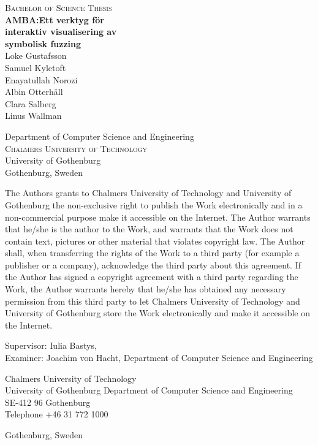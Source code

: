 \newpage
\thispagestyle{empty}
\begin{center}

	\textsc{\large Bachelor of Science Thesis }\\[4cm]

	\textbf{\Large AMBA:\@ Ett verktyg för \\ interaktiv visualisering av \\ symbolisk fuzzing} \\[1cm]
	{\large Loke Gustafsson} \\
	{\large Samuel Kyletoft} \\
	{\large Enayatullah Norozi} \\
	{\large Albin Otterhäll} \\
	{\large Clara Salberg} \\
	{\large Linus Wallman} \\

	\vfill

	Department of Computer Science and Engineering\\
	\textsc{Chalmers University of Technology} \\
	{\small University of Gothenburg} \\
	Gothenburg, Sweden \the\year{} \\
\end{center}


\newpage
{The Authors grants to Chalmers University of Technology and University of Gothenburg the
	non-exclusive right to publish the Work electronically and in a non-commercial purpose make it
	accessible on the Internet. The Author warrants that he/she is the author to the Work, and
	warrants that the Work does not contain text, pictures or other material that violates
	copyright law.
	The Author shall, when transferring the rights of the Work to a third party (for example a
	publisher or a company), acknowledge the third party about this agreement. If the Author has
	signed a copyright agreement with a third party regarding the Work, the Author warrants
	hereby that he/she has obtained any necessary permission from this third party to let Chalmers
	University of Technology and University of Gothenburg store the Work electronically and make
	it accessible on the Internet.}

Supervisor: Iulia Bastys, \\
Examiner: Joachim von Hacht, Department of Computer Science and Engineering\setlength{\parskip}{1cm}

Chalmers University of Technology\\
University of Gothenburg
Department of Computer Science and Engineering \\
SE-412 96 Gothenburg\\
Telephone +46 31 772 1000 \setlength{\parskip}{0.5cm}

\vfill
Gothenburg, Sweden \the\year{}
